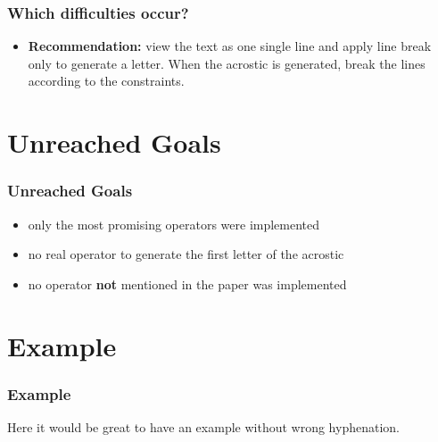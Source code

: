 \documentclass{beamer}
\begin{document}
\begin{frame}
\frametitle{Which difficulties occur?}
\begin{itemize}

	
	\item \textbf{Recommendation:} view the text as one single line and apply
	line break only to generate a letter. When the acrostic is generated,
	break the lines according to the constraints. 


\end{itemize}
\end{frame}



























\section{Unreached Goals}
\begin{frame}
\frametitle{Unreached Goals}
\begin{itemize}

	
	\item only the most promising operators were implemented
	\item no real operator to generate the first letter of the acrostic
	\item no operator \textbf{not} mentioned in the paper was implemented
	


\end{itemize}
\end{frame}



\section{Example}
\begin{frame}
\frametitle{Example}
Here it would be great to have an example without wrong hyphenation.


\end{frame}
\end{document}
